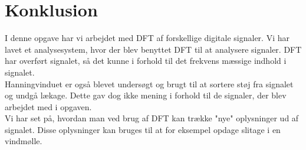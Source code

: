 \chapter{Konklusion}\label{ch:konclusion}
I denne opgave har vi arbejdet med DFT af forskellige digitale signaler. Vi har lavet et analysesystem, hvor der blev benyttet DFT til at analysere signaler. DFT har overført signalet, så det kunne i forhold til det frekvens mæssige indhold i signalet. \\ Hanningvinduet er også blevet undersøgt og brugt til at sortere støj fra signalet og undgå lækage. Dette gav dog ikke mening i forhold til de signaler, der blev arbejdet med i opgaven.\\
Vi har set på, hvordan man ved brug af DFT kan trække "nye" oplysninger ud af signalet. Disse oplysninger kan bruges til at for eksempel opdage slitage i en vindmølle.